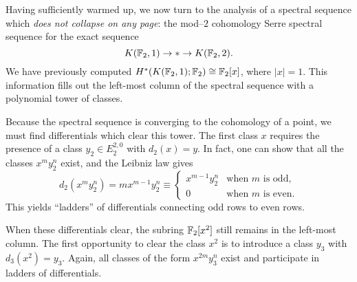 \begin{example}\label{Mod2CohomOfMod2EMSpaces}
Having sufficiently warmed up, we now turn to the analysis of a spectral sequence which \emph{does not collapse on any page}: the mod--$2$ cohomology Serre spectral sequence for the exact sequence \[K(\mathbb F_2, 1) \to * \to K(\mathbb F_2, 2).\]
We have previously computed $H^*(K(\mathbb F_2, 1); \mathbb F_2) \cong \mathbb F_2[x]$, where $|x| = 1$.
This information fills out the left-most column of the spectral sequence with a polynomial tower of classes.

Because the spectral sequence is converging to the cohomology of a point, we must find differentials which clear this tower.
The first class $x$ requires the presence of a class $y_2 \in E_2^{2, 0}$ with $d_2(x) = y$.
In fact, one can show that all the classes $x^m y_2^n$ exist, and the Leibniz law gives \[d_2(x^m y_2^n) = m x^{m-1} y_2^n \equiv \begin{cases} x^{m-1} y_2^n & \text{when $m$ is odd}, \\ 0 & \text{when $m$ is even}. \end{cases}\]
This yields ``ladders'' of differentials connecting odd rows to even rows.

When these differentials clear, the subring $\mathbb F_2[x^2]$ still remains in the left-most column.
The first opportunity to clear the class $x^2$ is to introduce a class $y_3$ with $d_3(x^2) = y_3$.
Again, all classes of the form $x^{2m} y_3^n$ exist and participate in ladders of differentials.


\end{example}
